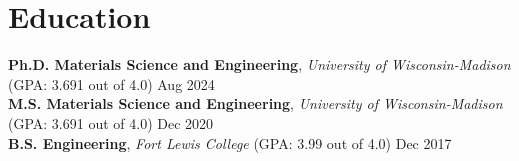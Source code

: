 \section{Education}

\textbf{Ph.D. Materials Science and Engineering}, \textit{University of Wisconsin-Madison} (GPA: 3.691 out of 4.0) \hfill Aug 2024\\
\textbf{M.S. Materials Science and Engineering}, \textit{University of Wisconsin-Madison} (GPA: 3.691 out of 4.0)  \hfill Dec 2020\\
\textbf{B.S. Engineering}, \textit{Fort Lewis College} (GPA: 3.99 out of 4.0)                                      \hfill Dec 2017%
